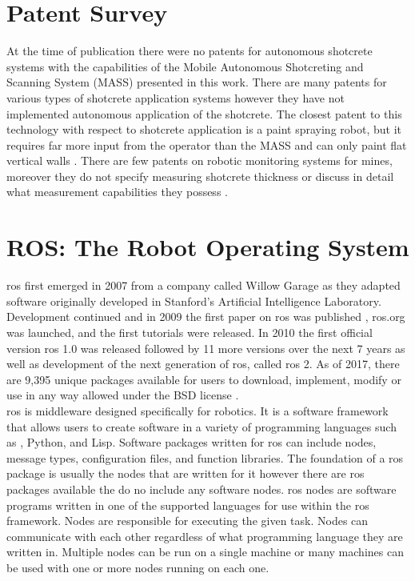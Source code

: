 \section{Patent Survey}

At the time of publication there were no patents for autonomous shotcrete systems with the capabilities of the Mobile Autonomous Shotcreting and Scanning System (MASS) presented in this work. There are many patents for various types of shotcrete application systems \cite{cn1,cn2,cn3,cn4,cn5,cn6,cn7,cn8} however they have not implemented autonomous application of the shotcrete. The closest patent to this technology with respect to shotcrete application is a paint spraying robot, but it requires far more input from the operator than the MASS and can only paint flat vertical walls \cite{paintpat}. There are few patents on robotic monitoring systems for mines, moreover they do not specify measuring shotcrete thickness or discuss in detail what measurement capabilities they possess \cite{pat1,pat2}.\\

\section{ROS: The Robot Operating System}
\label{sec:ros}

\acrshort{ros} first emerged in 2007 from a company called Willow Garage as they adapted software originally developed in Stanford's Artificial Intelligence Laboratory. Development continued and in 2009 the first paper on \acrshort{ros} was published \cite{rosfirst}, \acrshort{ros}.org was launched, and the first tutorials were released. In 2010 the first official version \acrshort{ros} 1.0 was released followed by 11 more versions over the next 7 years as well as development of the next generation of \acrshort{ros}, called \acrshort{ros} 2. As of 2017, there are 9,395 unique packages available for users to download, implement, modify or use in any way allowed under the BSD license \cite{bsd}.\\

\acrshort{ros} is middleware designed specifically for robotics. It is a software framework that allows users to create software in a variety of programming languages such as \CC, Python, and Lisp. Software packages written for \acrshort{ros} can include nodes, message types, configuration files, and function libraries. The foundation of a \acrshort{ros} package is usually the nodes that are written for it however there are \acrshort{ros} packages available the do no include any software nodes. \acrshort{ros} nodes are software programs written in one of the supported languages for use within the \acrshort{ros} framework. Nodes are responsible for executing the given task. Nodes can communicate with each other regardless of what programming language they are written in. Multiple nodes can be run on a single machine or many machines can be used with one or more nodes running on each one.\\

